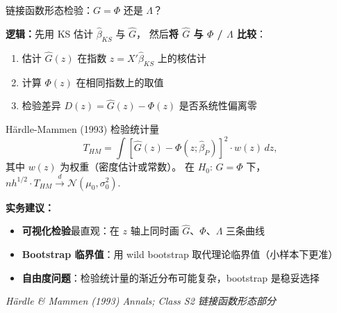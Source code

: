\documentclass[aspectratio=169, 10pt]{beamer}
\begin{document}
\begin{frame}{链接函数形态检验：$G = \Phi$ 还是 $\Lambda$？}

  \textbf{逻辑：}先用 KS 估计 $\hat\beta_{KS}$ 与 $\hat G$，
  然后\textbf{将 $\hat G$ 与 $\Phi$ / $\Lambda$ 比较}：

  \begin{enumerate}\setlength{\itemsep}{1pt}
    \item 估计 $\hat G(z)$ 在指数 $z = X'\hat\beta_{KS}$ 上的核估计
    \item 计算 $\Phi(z)$ 在相同指数上的取值
    \item 检验差异 $D(z) = \hat G(z) - \Phi(z)$ 是否系统性偏离零
  \end{enumerate}

  \begin{definitionbox}{{Härdle-Mammen (1993) 检验统计量}}
    $$T_{HM} = \int [\hat G(z) - \Phi(z; \hat\beta_P)]^2 \cdot w(z) \, dz,$$
    其中 $w(z)$ 为权重（密度估计或常数）。
    在 $H_0$: $G = \Phi$ 下，$nh^{1/2} \cdot T_{HM} \overset{d}{\to} \mathcal{N}(\mu_0, \sigma_0^2)$.
  \end{definitionbox}

  \begin{highlightbox}
    \textbf{实务建议：}
    \begin{itemize}\setlength{\itemsep}{1pt}
      \item \textbf{可视化检验}最直观：在 $z$ 轴上同时画 $\hat G$、$\Phi$、$\Lambda$ 三条曲线
      \item \textbf{Bootstrap 临界值}：用 wild bootstrap 取代理论临界值（小样本下更准）
      \item \textbf{自由度问题}：检验统计量的渐近分布可能复杂，bootstrap 是稳妥选择
    \end{itemize}
  \end{highlightbox}

  \hfill{\scriptsize\textit{Härdle \& Mammen (1993) Annals; Class S2 链接函数形态部分}}

\end{frame}
\end{document}
